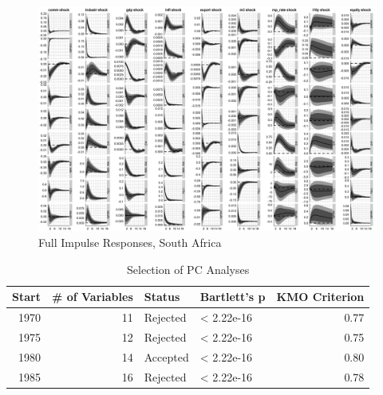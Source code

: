 \documentclass[12pt,]{article}
\begin{document}
\begin{figure}
\centering
\includegraphics[width=1.00000\textwidth]{img/irf_all_ZAF.png}
\caption{Full Impulse Responses, South Africa}
\end{figure}

\begin{table}

\caption{\label{tab:unnamed-chunk-5}Selection of PC Analyses}
\centering
\begin{tabular}[t]{r|r|l|l|r}
\hline
Start & \# of Variables & Status & Bartlett's p & KMO Criterion\\
\hline
1970 & 11 & Rejected & < 2.22e-16 & 0.77\\
\hline
1975 & 12 & Rejected & < 2.22e-16 & 0.75\\
\hline
1980 & 14 & Accepted & < 2.22e-16 & 0.80\\
\hline
1985 & 16 & Rejected & < 2.22e-16 & 0.78\\
\hline
\end{tabular}
\end{table}
\end{document}
